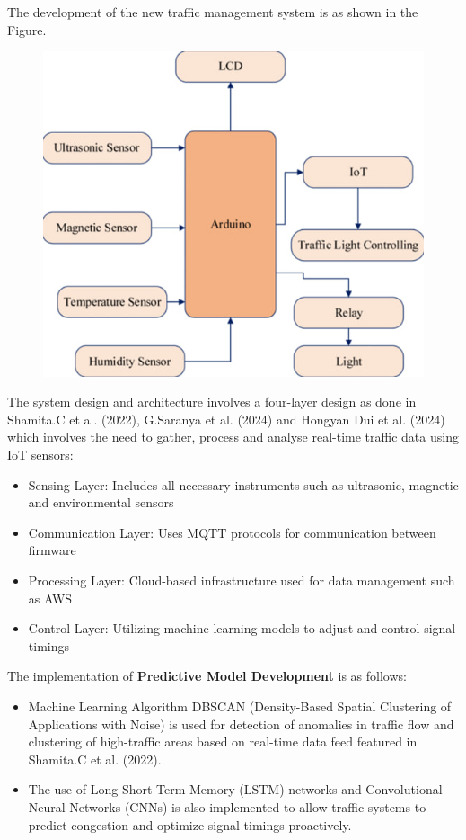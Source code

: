 \documentclass[12pt,a4paper]{article}
\begin{document}
The development of the new traffic management system is as shown in the Figure. 

\begin{figure}[h]
    \centering
    \includegraphics[width=0.5\linewidth]{photo_2024-09-25_10-58-21.jpg}

\end{figure}

The system design and architecture involves a four-layer design as done in Shamita.C et al. (2022), G.Saranya et al. (2024) and Hongyan Dui et al. (2024) which involves the need to gather, process and analyse real-time traffic data using IoT sensors:

\begin{itemize}
    \item Sensing Layer: Includes all necessary instruments such as ultrasonic, magnetic and environmental sensors 

    \item Communication Layer: Uses MQTT protocols for communication between firmware 

    \item Processing Layer: Cloud-based infrastructure used for data management such as AWS 

    \item Control Layer: Utilizing machine learning models to adjust and control signal timings  
\end{itemize}

The implementation of \textbf{Predictive Model Development} is as follows:

\begin{itemize}
    \item Machine Learning Algorithm DBSCAN (Density-Based Spatial Clustering of Applications with Noise) is used for detection of anomalies in traffic flow and clustering of high-traffic areas based on real-time data feed featured in Shamita.C et al. (2022). 

    \item The use of Long Short-Term Memory (LSTM) networks and Convolutional Neural Networks (CNNs) is also implemented to allow traffic systems to predict congestion and optimize signal timings proactively. 
\end{itemize}
\end{document}
